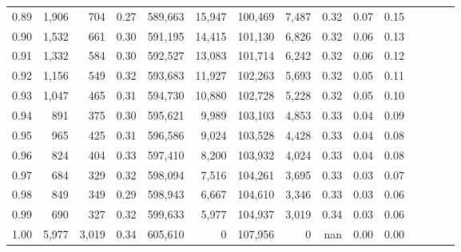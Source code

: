 \begin{tabular}{rrrcrrrrrrrrrrr}
0.89 &   1,906 &    704 &                                       0.27 &  589,663 &   15,947 &  100,469 &    7,487 &  0.32 &  0.07 &                         0.15 \\
0.90 &   1,532 &    661 &                                       0.30 &  591,195 &   14,415 &  101,130 &    6,826 &  0.32 &  0.06 &                         0.13 \\
0.91 &   1,332 &    584 &                                       0.30 &  592,527 &   13,083 &  101,714 &    6,242 &  0.32 &  0.06 &                         0.12 \\
0.92 &   1,156 &    549 &                                       0.32 &  593,683 &   11,927 &  102,263 &    5,693 &  0.32 &  0.05 &                         0.11 \\
0.93 &   1,047 &    465 &                                       0.31 &  594,730 &   10,880 &  102,728 &    5,228 &  0.32 &  0.05 &                         0.10 \\
0.94 &     891 &    375 &                                       0.30 &  595,621 &    9,989 &  103,103 &    4,853 &  0.33 &  0.04 &                         0.09 \\
0.95 &     965 &    425 &                                       0.31 &  596,586 &    9,024 &  103,528 &    4,428 &  0.33 &  0.04 &                         0.08 \\
0.96 &     824 &    404 &                                       0.33 &  597,410 &    8,200 &  103,932 &    4,024 &  0.33 &  0.04 &                         0.08 \\
0.97 &     684 &    329 &                                       0.32 &  598,094 &    7,516 &  104,261 &    3,695 &  0.33 &  0.03 &                         0.07 \\
0.98 &     849 &    349 &                                       0.29 &  598,943 &    6,667 &  104,610 &    3,346 &  0.33 &  0.03 &                         0.06 \\
0.99 &     690 &    327 &                                       0.32 &  599,633 &    5,977 &  104,937 &    3,019 &  0.34 &  0.03 &                         0.06 \\
1.00 &   5,977 &  3,019 &                                       0.34 &  605,610 &        0 &  107,956 &        0 &   nan &  0.00 &                         0.00 \\
\bottomrule
\end{tabular}
